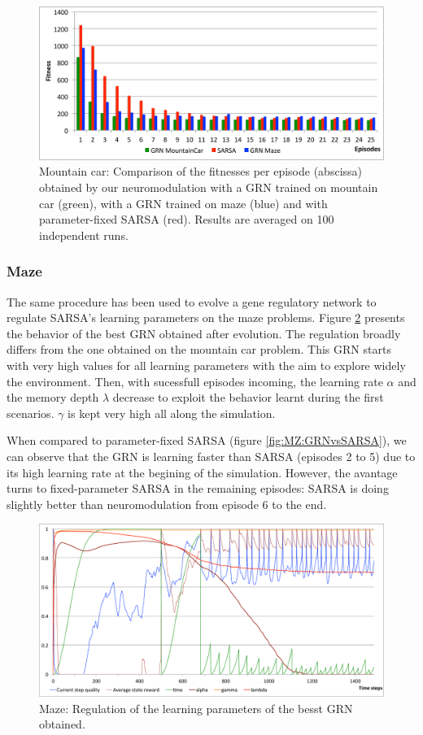 \begin{figure}
\center
\includegraphics[width=\linewidth]{MC_GRNvsSARSA.pdf}
\caption{Mountain car: Comparison of the fitnesses per episode (abscissa) obtained by our neuromodulation with a GRN trained on mountain car (green), with a GRN trained on maze (blue) and with parameter-fixed SARSA (red). Results are averaged on 100 independent runs.}\label{fig:MC:GRNvsSARSA}
\end{figure}

\subsubsection{Maze}
The same procedure has been used to evolve a gene regulatory network to regulate SARSA's learning parameters on the maze problems. Figure \ref{fig:MZ:GRNBehavior} presents the behavior of the best GRN obtained after evolution. The regulation broadly differs from the one obtained on the mountain car problem. This GRN starts with very high values for all learning parameters with the aim to explore widely the environment. Then, with sucessfull episodes incoming, the learning rate $\alpha$ and the memory depth $\lambda$ decrease to exploit the behavior learnt during the first scenarios. $\gamma$ is kept very high all along the simulation.

When compared to parameter-fixed SARSA (figure \ref{fig:MZ:GRNvsSARSA}), we can observe that the GRN is learning faster than SARSA (episodes 2 to 5) due to its high learning rate at the begining of the simulation. However, the avantage turns to fixed-parameter SARSA in the remaining episodes: SARSA is doing slightly better than neuromodulation from episode 6 to the end.

\begin{figure}
\center
\includegraphics[width=\linewidth]{MZ_GRNBehavior.pdf}
\caption{Maze: Regulation of the learning parameters of the besst GRN obtained.}\label{fig:MZ:GRNBehavior}
\end{figure}

